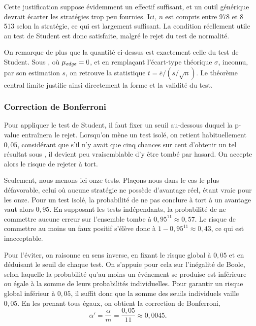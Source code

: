 Cette justification suppose évidemment un effectif suffisant, et un outil
générique devrait écarter les stratégies trop peu fournies. Ici, \(n\) est
compris entre 978 et 8\,513 selon la stratégie, ce qui est largement
suffisant. La condition réellement utile au test de Student est donc
satisfaite, malgré le rejet du test de normalité.

On remarque de plus que la quantité ci-dessus est exactement celle du test de
Student. Sous \Hzero{}, où \(\mu_{\textit{edge}} = 0\), et en remplaçant
l'écart-type théorique \(\sigma\), inconnu, par son estimation \(s\), on
retrouve la statistique \(t = \bar e / (s/\sqrt{n})\). Le théorème central
limite justifie ainsi directement la forme et la validité du test.

\subsubsection*{Correction de Bonferroni}

Pour appliquer le test de Student, il faut fixer un seuil au-dessous duquel
la p-value entraînera le rejet. Lorsqu'on mène un test isolé, on retient
habituellement \(0{,}05\), considérant que s'il n'y avait que cinq chances sur
cent d'obtenir un tel résultat sous \Hzero{}, il devient peu vraisemblable d'y
être tombé par hasard. On accepte alors le risque de rejeter \Hzero{} à tort.

Seulement, nous menons ici onze tests. Plaçons-nous dans le cas le plus
défavorable, celui où aucune stratégie ne possède d'avantage réel, \Hzero{}
étant vraie pour les onze. Pour un test isolé, la probabilité de ne pas
conclure à tort à un avantage vaut alors \(0{,}95\). En supposant les tests
indépendants, la probabilité de ne commettre aucune erreur sur l'ensemble
tombe à \(0{,}95^{11} \approx 0{,}57\). Le risque de commettre au moins un
faux positif s'élève donc à \(1 - 0{,}95^{11} \approx 0{,}43\), ce qui est
inacceptable.

Pour l'éviter, on raisonne en sens inverse, en fixant le risque global à
\(0{,}05\) et en déduisant le seuil de chaque test. On s'appuie pour cela sur
l'inégalité de Boole, selon laquelle la probabilité qu'au moins un événement
se produise est inférieure ou égale à la somme de leurs probabilités
individuelles. Pour garantir un risque global inférieur à \(0{,}05\), il
suffit donc que la somme des seuils individuels vaille \(0{,}05\). En les
prenant tous égaux, on obtient la correction de Bonferroni,
\[
  \alpha' = \frac{\alpha}{m} = \frac{0{,}05}{11} \approx 0{,}0045 .
\]

